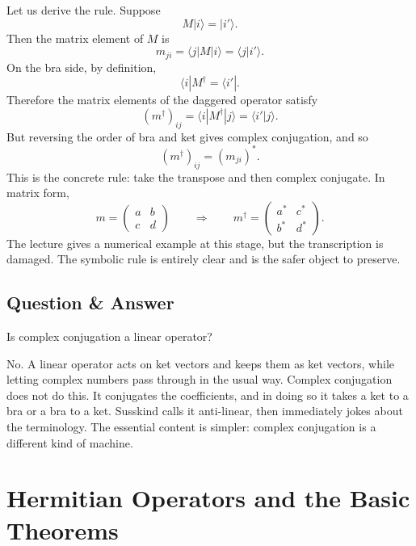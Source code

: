 Let us derive the rule. Suppose
\begin{equation}
M|i\rangle=|i'\rangle.
\end{equation}
Then the matrix element of \(M\) is
\begin{equation}
m_{ji}=\langle j|M|i\rangle=\langle j|i'\rangle.
\end{equation}
On the bra side, by definition,
\begin{equation}
\langle i|M^\dagger=\langle i'|.
\end{equation}
Therefore the matrix elements of the daggered operator satisfy
\begin{equation}
(m^\dagger)_{ij}=\langle i|M^\dagger|j\rangle=\langle i'|j\rangle.
\end{equation}
But reversing the order of bra and ket gives complex conjugation, and so
\begin{equation}
(m^\dagger)_{ij}=(m_{ji})^*.
\end{equation}
This is the concrete rule: take the transpose and then complex conjugate. In matrix form,
\begin{equation}
m=
\begin{pmatrix}
a & b \\
c & d
\end{pmatrix}
\qquad \Longrightarrow \qquad
m^\dagger=
\begin{pmatrix}
a^* & c^* \\
b^* & d^*
\end{pmatrix}.
\end{equation}
The lecture gives a numerical example at this stage, but the transcription is damaged. The symbolic rule is entirely clear and is the safer object to preserve.

\subsection{Question \& Answer}

Is complex conjugation a linear operator?

No. A linear operator acts on ket vectors and keeps them as ket vectors, while letting complex numbers pass through in the usual way. Complex conjugation does not do this. It conjugates the coefficients, and in doing so it takes a ket to a bra or a bra to a ket. Susskind calls it anti-linear, then immediately jokes about the terminology. The essential content is simpler: complex conjugation is a different kind of machine.

\section{Hermitian Operators and the Basic Theorems}

